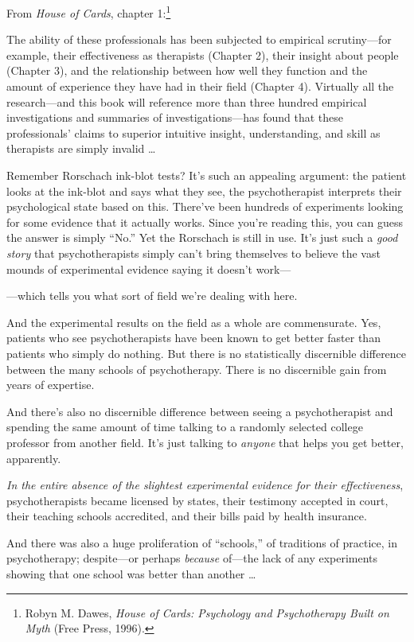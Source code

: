 {
 From \textit{House of Cards}, chapter 1:\footnote{Robyn M. Dawes, \textit{House of Cards: Psychology and
Psychotherapy Built on Myth} (Free Press, 1996).}}

{
 The ability of these professionals has been subjected to empirical
scrutiny---for example, their effectiveness as therapists (Chapter 2),
their insight about people (Chapter 3), and the relationship between
how well they function and the amount of experience they have had in
their field (Chapter 4). Virtually all the research---and this book
will reference more than three hundred empirical investigations and
summaries of investigations---has found that these
professionals' claims to superior intuitive insight,
understanding, and skill as therapists are simply invalid \ldots}

{
 Remember Rorschach ink-blot tests? It's such an
appealing argument: the patient looks at the ink-blot and says what
they see, the psychotherapist interprets their psychological state
based on this. There've been hundreds of experiments
looking for some evidence that it actually works. Since
you're reading this, you can guess the answer is simply
``No.'' Yet the Rorschach is still
in use. It's just such a \textit{good story} that
psychotherapists simply can't bring themselves to
believe the vast mounds of experimental evidence saying it
doesn't work---}

{
 {}---which tells you what sort of field we're
dealing with here.}

{
 And the experimental results on the field as a whole are
commensurate. Yes, patients who see psychotherapists have been known to
get better faster than patients who simply do nothing. But there is no
statistically discernible difference between the many schools of
psychotherapy. There is no discernible gain from years of expertise.}

{
 And there's also no discernible difference between
seeing a psychotherapist and spending the same amount of time talking
to a randomly selected college professor from another field.
It's just talking to \textit{anyone} that helps you get
better, apparently.}

{
 \textit{In the entire absence of the slightest experimental
evidence for their effectiveness}, psychotherapists became licensed by
states, their testimony accepted in court, their teaching schools
accredited, and their bills paid by health insurance.}

{
 And there was also a huge proliferation of
``schools,'' of traditions of
practice, in psychotherapy; despite---or perhaps \textit{because}
of---the lack of any experiments showing that one school was better
than another \ldots}

